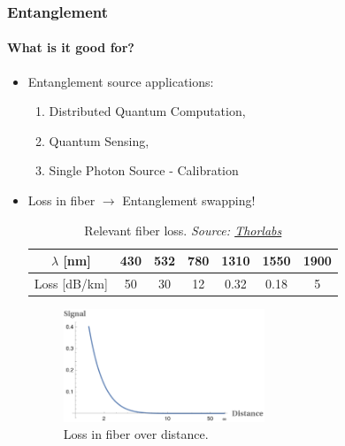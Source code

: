 \documentclass[serif,8pt]{beamer}
\begin{document}
\begin{frame}[t]
	\frametitle{Entanglement}
	\framesubtitle{What is it good for?}
	\begin{itemize}
		\item Entanglement source applications:
			\begin{enumerate}
				\item Distributed Quantum Computation, %
				\item Quantum Sensing,
				\item Single Photon Source - Calibration
			\end{enumerate}
		\item Loss in fiber $\rightarrow$ Entanglement swapping!
	\begin{table}
		\caption{Relevant fiber loss. \textit{Source: \href{https://www.thorlabs.com/newgrouppage9.cfm?objectgroup_id=949}{Thorlabs}}}
		\label{tab:fiberloss}
		\begin{tabular}{|c|c|c|c|c|c|c|}
			\hline
			$\lambda$ [nm] & 430 & 532 & 780 & 1310 & 1550 & 1900\\
			\hline
			Loss [dB/km] & 50 & 30 & 12 & 0.32 &  0.18 & 5\\
			\hline
		\end{tabular}
	\end{table}
	\begin{figure}
		\begin{center}
			\includegraphics[width=6cm]{FiberLoss.png}
		\end{center}
		\caption{Loss in fiber over distance.}\label{fig:fiberloss}
	\end{figure}
	\end{itemize}
\end{frame}
\end{document}
